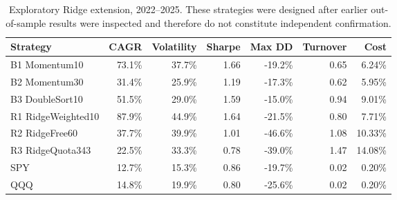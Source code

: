 \begin{table}[H]
\centering
\small
\begin{tabular}{lrrrrrr}
\toprule
Strategy & CAGR & Volatility & Sharpe & Max DD & Turnover & Cost \\
\midrule
B1 Momentum10 & 73.1\% & 37.7\% & 1.66 & -19.2\% & 0.65 & 6.24\% \\
B2 Momentum30 & 31.4\% & 25.9\% & 1.19 & -17.3\% & 0.62 & 5.95\% \\
B3 DoubleSort10 & 51.5\% & 29.0\% & 1.59 & -15.0\% & 0.94 & 9.01\% \\
R1 RidgeWeighted10 & 87.9\% & 44.9\% & 1.64 & -21.5\% & 0.80 & 7.71\% \\
R2 RidgeFree60 & 37.7\% & 39.9\% & 1.01 & -46.6\% & 1.08 & 10.33\% \\
R3 RidgeQuota343 & 22.5\% & 33.3\% & 0.78 & -39.0\% & 1.47 & 14.08\% \\
SPY & 12.7\% & 15.3\% & 0.86 & -19.7\% & 0.02 & 0.20\% \\
QQQ & 14.8\% & 19.9\% & 0.80 & -25.6\% & 0.02 & 0.20\% \\
\bottomrule
\end{tabular}
\caption{Exploratory Ridge extension, 2022--2025. These strategies were designed after earlier out-of-sample results were inspected and therefore do not constitute independent confirmation.}
\label{tab:extension}
\end{table}
